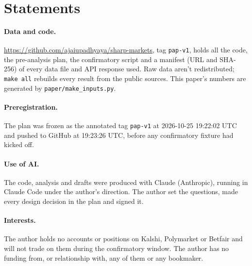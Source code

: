 \documentclass[11pt]{article}
\newcommand{\repo}{\url{https://github.com/ajaiupadhyaya/sharp-markets}}
\begin{document}
\section*{Statements}

\paragraph{Data and code.} \repo{}, tag \texttt{pap-v1}, holds all the code, the pre-analysis
plan, the confirmatory script and a manifest (URL and SHA-256) of every data file and API
response used. Raw data aren't redistributed; \texttt{make all} rebuilds every result from the
public sources. This paper's numbers are generated by \texttt{paper/make\_inputs.py}.

\paragraph{Preregistration.} The plan was frozen as the annotated tag \texttt{pap-v1} at
2026-10-25 19:22:02 UTC and pushed to GitHub at 19:23:26 UTC, before any confirmatory fixture
had kicked off.

\paragraph{Use of AI.} The code, analysis and drafts were produced with Claude (Anthropic),
running in Claude Code under the author's direction. The author set the questions, made every
design decision in the plan and signed it.

\paragraph{Interests.} The author holds no accounts or positions on Kalshi, Polymarket or Betfair
and will not trade on them during the confirmatory window. The author has no funding from, or
relationship with, any of them or any bookmaker.



\end{document}
